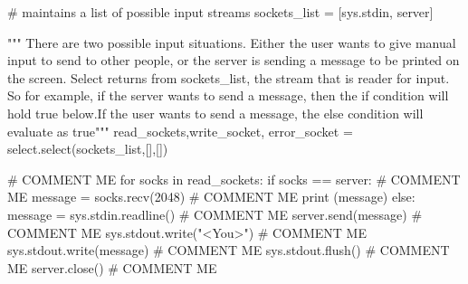 \documentclass[paper=a4,fontsize=11pt]{scrartcl}%
\numberwithin{equation}{section}
\begin{document}
\begin{enumerate}
\begin{python}
    # maintains a list of possible input streams
    sockets_list = [sys.stdin, server]
 
    """ There are two possible input situations. Either the
    user wants to give manual input to send to other people,
    or the server is sending a message to be printed on the
    screen. Select returns from sockets_list, the stream that
    is reader for input. So for example, if the server wants
    to send a message, then the if condition will hold true
    below.If the user wants to send a message, the else
    condition will evaluate as true"""
    read_sockets,write_socket, error_socket = select.select(sockets_list,[],[])
 
 	# COMMENT ME 
    for socks in read_sockets:
        if socks == server: # COMMENT ME
            message = socks.recv(2048) # COMMENT ME
            print (message)
        else:
            message = sys.stdin.readline() # COMMENT ME
            server.send(message) # COMMENT ME
            sys.stdout.write("<You>") # COMMENT ME
            sys.stdout.write(message) # COMMENT ME
            sys.stdout.flush() # COMMENT ME
server.close() # COMMENT ME
	\end{python}
\end{enumerate}

\printbibliography
\end{document}
